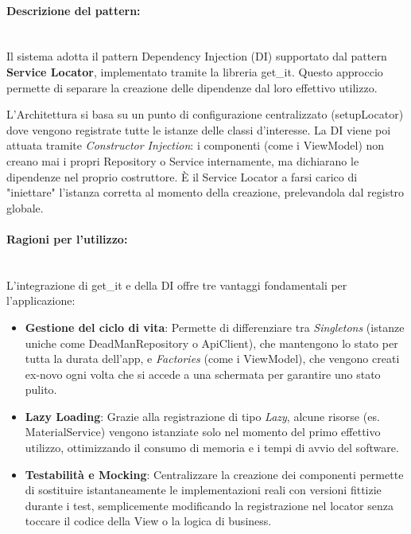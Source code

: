 \documentclass[a4paper,12pt]{article}
\newcommand{\ignoreglossary}{}
\newcommand{\code}[1]{{\ttfamily\textcolor{purple!85!black}{#1}}}
\begin{document}
\paragraph{Descrizione del pattern:}\mbox{}\\
Il sistema adotta il pattern Dependency Injection (DI) supportato dal pattern \textbf{Service Locator}, implementato tramite la libreria \code{get\_it}. Questo approccio permette di separare la creazione delle dipendenze dal loro effettivo utilizzo. 

L'Architettura si basa su un punto di configurazione centralizzato (\code{setupLocator}) dove vengono registrate tutte le istanze delle classi d'interesse. La DI viene poi attuata tramite \textit{Constructor Injection}: i componenti (come i ViewModel) non creano mai i propri Repository o Service internamente, ma dichiarano le dipendenze nel proprio costruttore. È il Service Locator a farsi carico di "iniettare" l'istanza corretta al momento della creazione, prelevandola dal registro globale.

\paragraph{Ragioni per l'utilizzo:}\mbox{}\\
L'integrazione di \code{get\_it} e della DI offre tre vantaggi fondamentali per l'applicazione:
\begin{itemize}
	\item \textbf{Gestione del \ignoreglossary{ciclo di vita}}: Permette di differenziare tra \textit{Singletons} (istanze uniche come \code{DeadManRepository} o \code{ApiClient}), che mantengono lo stato per tutta la durata dell'app, e \textit{Factories} (come i ViewModel), che vengono creati ex-novo ogni volta che si accede a una schermata per garantire uno stato pulito.
	\item \textbf{Lazy Loading}: Grazie alla registrazione di tipo \textit{Lazy}, alcune risorse (es. \code{MaterialService}) vengono istanziate solo nel momento del primo effettivo utilizzo, ottimizzando il consumo di memoria e i tempi di avvio del software.
	\item \textbf{Testabilità e Mocking}: Centralizzare la creazione dei componenti permette di sostituire istantaneamente le implementazioni reali con versioni fittizie durante i test, semplicemente modificando la registrazione nel locator senza toccare il codice della View o la logica di business.
\end{itemize}
\end{document}

